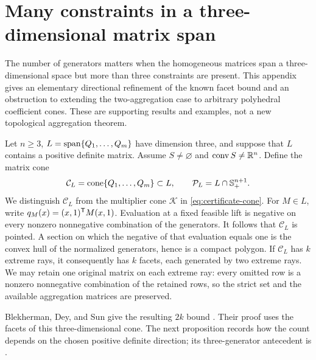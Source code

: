 \section{Many constraints in a three-dimensional matrix span}
\label{app:three-span}

The number of generators matters when the homogeneous matrices span a
three-dimensional space but more than three constraints are present.
This appendix gives an elementary directional refinement of the known
facet bound and an obstruction to extending the two-aggregation case to
arbitrary polyhedral coefficient cones. These are supporting results and
examples, not a new topological aggregation theorem.

Let $n\geq3$, $L=\operatorname{span}\{Q_1,\ldots,Q_m\}$ have dimension three,
and suppose that $L$ contains a positive definite matrix. Assume
$S\ne\varnothing$ and $\operatorname{conv} S\ne\mathbb R^n$. Define the matrix cone
\[
 \mathcal C_L=\operatorname{cone}\{Q_1,\ldots,Q_m\}\subset L,
 \qquad \mathcal P_L=L\cap\mathbb S^{n+1}_+.
\]
We distinguish $\mathcal C_L$ from the multiplier cone $\mathcal K$
in \eqref{eq:certificate-cone}. For $M\in L$, write
$q_M(x)=(x,1)^{\mathsf T} M(x,1)$.
Evaluation at a fixed feasible lift is negative on every nonzero
nonnegative combination of the generators. It follows that $\mathcal C_L$
is pointed. A section on which the negative of that evaluation equals one
is the convex hull of the normalized generators, hence is a compact
polygon. If $\mathcal C_L$ has $k$ extreme rays, it consequently has
$k$ facets, each generated by two extreme rays. We may retain one
original matrix on each extreme ray: every omitted row is a nonzero
nonnegative combination of the retained rows, so the strict set and the
available aggregation matrices are preserved.

Blekherman, Dey, and Sun give the resulting $2k$ bound
\citep[Proposition~2.22]{BDSpreprint}. Their proof uses the facets of
this three-dimensional cone. The next proposition records how the count
depends on the chosen positive definite direction; its three-generator
antecedent is \citet[Proposition~8.6]{BDpreprint}.

